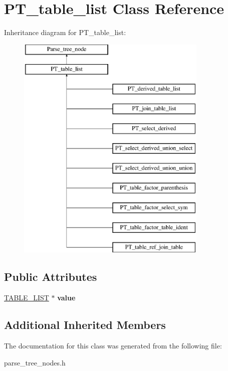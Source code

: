 \hypertarget{classPT__table__list}{}\section{P\+T\+\_\+table\+\_\+list Class Reference}
\label{classPT__table__list}
Inheritance diagram for P\+T\+\_\+table\+\_\+list\+:\begin{figure}[H]
\begin{center}
\leavevmode
\includegraphics[height=11.000000cm]{classPT__table__list}
\end{center}
\end{figure}
\subsection*{Public Attributes}
\begin{DoxyCompactItemize}
\item 
\mbox{\label{classPT__table__list_a1cc2d26d2e74da2aaac8d6400f83d3f4}} 
\mbox{\hyperlink{structTABLE__LIST}{T\+A\+B\+L\+E\+\_\+\+L\+I\+ST}} $\ast$ {\bfseries value}
\end{DoxyCompactItemize}
\subsection*{Additional Inherited Members}


The documentation for this class was generated from the following file\+:\begin{DoxyCompactItemize}
\item 
parse\+\_\+tree\+\_\+nodes.\+h\end{DoxyCompactItemize}
